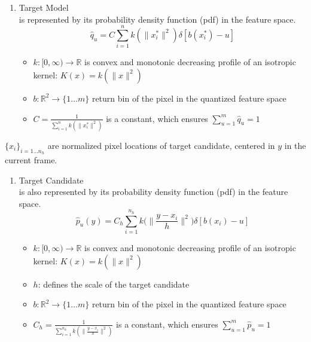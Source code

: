 \documentclass[hyperref={pdfpagelabels=false}]{beamer}
\newcounter{saveenumi}
\newcommand{\conti}{\setcounter{enumi}{\value{saveenumi}}}
\begin{document}

\begin{frame}
\begin{enumerate}\conti
\item Target Model \\
	 is represented by its {\color{darkred} probability density function} (pdf) in the feature space.
	 $$ \hat{q}_u = C \sum_{i=1}^{n}k(\lVert x^{*}_i\rVert^2)\delta[b(x^{*}_i)-u]$$
	 
	 \begin{itemize}
	 \item $k: [0, \infty)\rightarrow \mathbb{R}$ is convex and monotonic decreasing {\color{darkred} profile of an isotropic kernel}: $K(x) = k(\lVert x\rVert^2)$ %
	 
	 \item $b: \mathbb{R}^2 \rightarrow \{1\dots m \}$ return bin of the pixel in the quantized feature space
	 
	 \item $C=\frac{1}{\sum_{i=1}^{n}k(\lVert x^{*}_i\rVert^2)}$ is a constant, which ensures $\sum_{u=1}^{m}\hat{q}_u=1$
	 \end{itemize}
\end{enumerate} 

\end{frame}


\begin{frame}
 $\{x_i\}_{i=1\dots n_h}$ are normalized pixel locations of target candidate, centered in $y$ in the current frame.
\begin{enumerate}\conti
\item Target Candidate \\
	 is also represented by its {\color{darkred} probability density function} (pdf) in the feature space.
	 $$ \hat{p}_u(y) = C_h \sum_{i=1}^{n_h}k\Big(\Big\lVert\frac{ y-x_i}{h}\Big\rVert^2\Big)\delta[b(x_i)-u]$$
	 
	 \begin{itemize}
	 \item $k: [0, \infty)\rightarrow \mathbb{R}$ is convex and monotonic decreasing {\color{darkred} profile of an isotropic kernel}: $K(x) = k(\lVert x\rVert^2)$ %
	 \item $h$: defines the scale of the target candidate
	 
	 \item $b: \mathbb{R}^2 \rightarrow \{1\dots m \}$ return bin of the pixel in the quantized feature space
	 
	 \item $C_h=\frac{1}{\sum_{i=1}^{n_h}k(\lVert \frac{ y-x_i}{h} \rVert^2)}$ is a constant, which ensures $\sum_{u=1}^{m}\hat{p}_u=1$
	 \end{itemize}
\end{enumerate} 

\end{frame}
\end{document}
